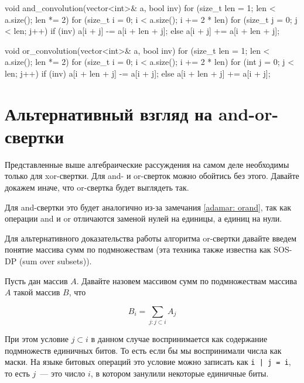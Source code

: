 \begin{code}
void and_convolution(vector<int>& a, bool inv) {
    for (size_t len = 1; len < a.size(); len *= 2) {
        for (size_t i = 0; i < a.size(); i += 2 * len) {
            for (size_t j = 0; j < len; j++) {
                if (inv) {
                    a[i + j] -= a[i + len + j];
                } else {
                    a[i + j] += a[i + len + j];
                }
            }
        }
    }
}
\end{code}

\begin{code}
void or_convolution(vector<int>& a, bool inv) {
    for (size_t len = 1; len < a.size(); len *= 2) {
        for (size_t i = 0; i < a.size(); i += 2 * len) {
            for (int j = 0; j < len; j++) {
                if (inv) {
                    a[i + len + j] -= a[i + j];
                } else {
                    a[i + len + j] += a[i + j];
                }
            }
        }
    }
}
\end{code}

\section{Альтернативный взгляд на and-or-свертки}

Представленные выше алгебраические рассуждения на самом деле необходимы только для xor-свертки. Для and- и or-сверток можно обойтись без этого. Давайте докажем иначе, что or-свертка будет выглядеть так.

Для and-свертки это будет аналогично из-за замечания \ref{adamar: orand}, так как операции and и or отличаются заменой нулей на единицы, а единиц на нули.

Для альтернативного доказательства работы алгоритма or-свертки давайте введем понятие массива сумм по подмножествам (эта техника также известна как SOS-DP (sum over subsets)).

\begin{definition}
    Пусть дан массив $A$. Давайте назовем массивом сумм по подмножествам массива $A$ такой массив $B$, что

    $$ B_i = \sum_{j : j \subset i} A_j$$

    При этом условие $j \subset i$ в данном случае воспринимается как содержание подмножеств единичных битов. То есть если бы мы воспринимали числа как маски. На языке битовых операций это условие можно записать как \verb+i | j = i+, то есть $j$~--- это число $i$, в котором занулили некоторые единичные биты.
\end{definition}

